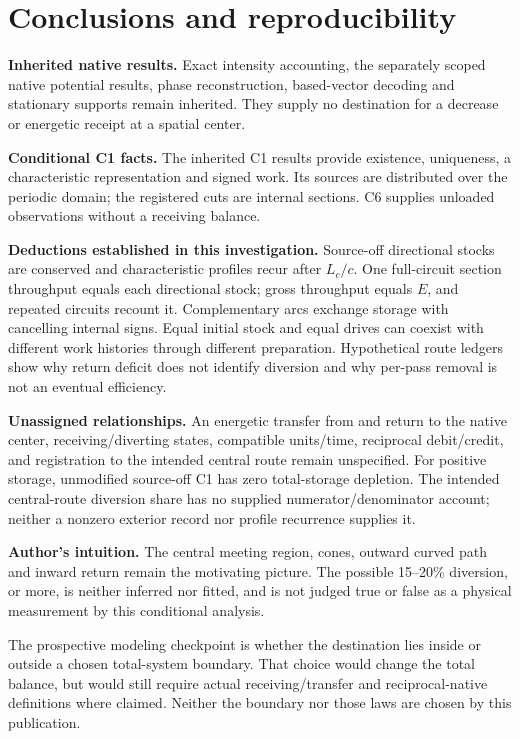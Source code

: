 \section{Conclusions and reproducibility}\label{sec:conclusion}
\textbf{Inherited native results.}
Exact intensity accounting, the separately scoped native potential results, phase reconstruction, based-vector decoding and stationary supports remain inherited. They supply no destination for a decrease or energetic receipt at a spatial center.

\textbf{Conditional C1 facts.}
The inherited C1 results provide existence, uniqueness, a characteristic representation and signed work. Its sources are distributed over the periodic domain; the registered cuts are internal sections. C6 supplies unloaded observations without a receiving balance.

\textbf{Deductions established in this investigation.}
Source-off directional stocks are conserved and characteristic profiles recur after $L_c/c$. One full-circuit section throughput equals each directional stock; gross throughput equals $E$, and repeated circuits recount it. Complementary arcs exchange storage with cancelling internal signs. Equal initial stock and equal drives can coexist with different work histories through different preparation. Hypothetical route ledgers show why return deficit does not identify diversion and why per-pass removal is not an eventual efficiency.

\textbf{Unassigned relationships.}
An energetic transfer from and return to the native center, receiving/diverting states, compatible units/time, reciprocal debit/credit, and registration to the intended central route remain unspecified. For positive storage, unmodified source-off C1 has zero total-storage depletion. The intended central-route diversion share has no supplied numerator/denominator account; neither a nonzero exterior record nor profile recurrence supplies it.

\textbf{Author's intuition.}
The central meeting region, cones, outward curved path and inward return remain the motivating picture. The possible 15--20\% diversion, or more, is neither inferred nor fitted, and is not judged true or false as a physical measurement by this conditional analysis.

The prospective modeling checkpoint is whether the destination lies inside or outside a chosen total-system boundary. That choice would change the total balance, but would still require actual receiving/transfer and reciprocal-native definitions where claimed. Neither the boundary nor those laws are chosen by this publication.

